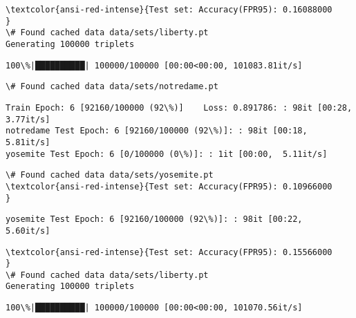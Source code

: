 \documentclass[11pt]{article}
\begin{document}
    \begin{Verbatim}[commandchars=\\\{\}]
\textcolor{ansi-red-intense}{Test set: Accuracy(FPR95): 0.16088000
}
\# Found cached data data/sets/liberty.pt
Generating 100000 triplets

    \end{Verbatim}

    \begin{Verbatim}[commandchars=\\\{\}]
100\%|██████████| 100000/100000 [00:00<00:00, 101083.81it/s]

    \end{Verbatim}

    \begin{Verbatim}[commandchars=\\\{\}]
\# Found cached data data/sets/notredame.pt

    \end{Verbatim}

    \begin{Verbatim}[commandchars=\\\{\}]
Train Epoch: 6 [92160/100000 (92\%)]	Loss: 0.891786: : 98it [00:28,  3.77it/s]
notredame Test Epoch: 6 [92160/100000 (92\%)]: : 98it [00:18,  5.81it/s]
yosemite Test Epoch: 6 [0/100000 (0\%)]: : 1it [00:00,  5.11it/s]
    \end{Verbatim}

    \begin{Verbatim}[commandchars=\\\{\}]
\# Found cached data data/sets/yosemite.pt
\textcolor{ansi-red-intense}{Test set: Accuracy(FPR95): 0.10966000
}

    \end{Verbatim}

    \begin{Verbatim}[commandchars=\\\{\}]
yosemite Test Epoch: 6 [92160/100000 (92\%)]: : 98it [00:22,  5.60it/s]

    \end{Verbatim}

    \begin{Verbatim}[commandchars=\\\{\}]
\textcolor{ansi-red-intense}{Test set: Accuracy(FPR95): 0.15566000
}
\# Found cached data data/sets/liberty.pt
Generating 100000 triplets

    \end{Verbatim}

    \begin{Verbatim}[commandchars=\\\{\}]
100\%|██████████| 100000/100000 [00:00<00:00, 101070.56it/s]

    \end{Verbatim}
\end{document}
